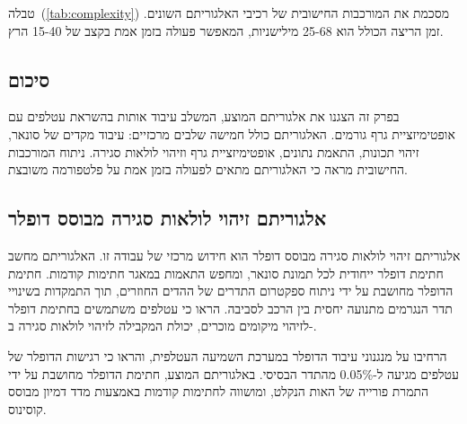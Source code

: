 \begin{table}[htbp]
    \centering
    \caption{מורכבות חישובית של רכיבי . (Computational complexity of BioSLAM components.)}
    \label{tab:complexity}
\end{table}

טבלה~(\ref{tab:complexity}) מסכמת את המורכבות החישובית של רכיבי האלגוריתם השונים. זמן הריצה הכולל הוא 25-68 מילישניות, המאפשר פעולה בזמן אמת בקצב של 15-40 הרץ.

\subsection{סיכום}
\label{sec:algo_summary}

בפרק זה הצגנו את אלגוריתם  המוצע, המשלב עיבוד אותות בהשראת עטלפים עם אופטימיזציית גרף גורמים. האלגוריתם כולל חמישה שלבים מרכזיים: עיבוד מקדים של סונאר, זיהוי תכונות, התאמת נתונים, אופטימיזציית גרף וזיהוי לולאות סגירה. ניתוח המורכבות החישובית מראה כי האלגוריתם מתאים לפעולה בזמן אמת על פלטפורמה משובצת.

\subsection{אלגוריתם זיהוי לולאות סגירה מבוסס דופלר}
\label{sec:doppler_loop_closure}

אלגוריתם זיהוי לולאות סגירה מבוסס דופלר הוא חידוש מרכזי של עבודה זו. האלגוריתם מחשב חתימת דופלר ייחודית לכל תמונת סונאר, ומחפש התאמות במאגר חתימות קודמות. חתימת הדופלר מחושבת על ידי ניתוח ספקטרום התדרים של ההדים החוזרים, תוך התמקדות בשינויי תדר הנגרמים מתנועה יחסית בין הרכב לסביבה. \citet{Schuller1974DSC} הראו כי עטלפים משתמשים בחתימת דופלר לזיהוי מיקומים מוכרים, יכולת המקבילה לזיהוי לולאות סגירה ב-.

\citet{GriffithBatEcholocation} הרחיבו על מנגנוני עיבוד הדופלר במערכת השמיעה העטלפית, והראו כי רגישות הדופלר של עטלפים מגיעה ל-0.05\% מהתדר הבסיסי. באלגוריתם המוצע, חתימת הדופלר מחושבת על ידי התמרת פורייה של האות הנקלט, ומושווה לחתימות קודמות באמצעות מדד דמיון מבוסס קוסינוס.

